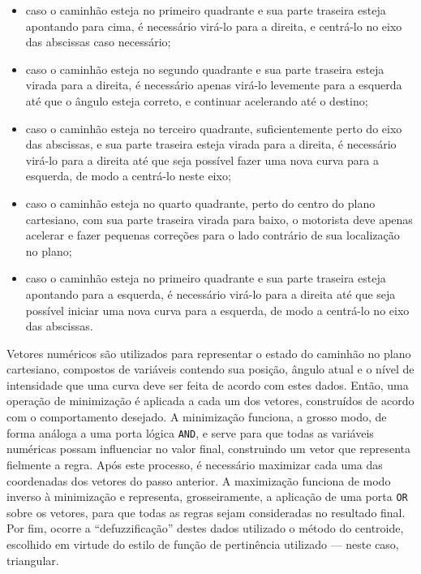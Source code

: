 \documentclass{../../sftex/sftex}
\begin{document}
\begin{itemize}

    \item caso o caminhão esteja no primeiro quadrante e sua parte traseira
        esteja apontando para cima, é necessário virá-lo para a direita, e
        centrá-lo no eixo das abscissas caso necessário;

    \item caso o caminhão esteja no segundo quadrante e sua parte traseira
        esteja virada para a direita, é necessário apenas virá-lo levemente
        para a esquerda até que o ângulo esteja correto, e continuar
        acelerando até o destino;

    \item caso o caminhão esteja no terceiro quadrante, suficientemente perto
        do eixo das abscissas, e sua parte traseira esteja virada para a
        direita, é necessário virá-lo para a direita até que seja possível
        fazer uma nova curva para a esquerda, de modo a centrá-lo neste eixo;

    \item caso o caminhão esteja no quarto quadrante, perto do centro do plano
        cartesiano, com sua parte traseira virada para baixo, o motorista
        deve apenas acelerar e fazer pequenas correções para o lado contrário
        de sua localização no plano;

    \item caso o caminhão esteja no primeiro quadrante e sua parte traseira
        esteja apontando para a esquerda, é necessário virá-lo para a direita
        até que seja possível iniciar uma nova curva para a esquerda, de
        modo a centrá-lo no eixo das abscissas.

\end{itemize}

Vetores numéricos são utilizados para representar o estado do caminhão no
plano cartesiano, compostos de variáveis contendo sua posição, ângulo atual
e o nível de intensidade que uma curva deve ser feita de acordo com estes
dados. Então, uma operação de minimização é aplicada a cada um dos vetores,
construídos de acordo com o comportamento desejado. A minimização funciona,
a grosso modo, de forma análoga a uma porta lógica \texttt{AND}, e serve para
que todas as variáveis numéricas possam influenciar no valor final,
construindo um vetor que representa fielmente a regra. Após este processo, é
necessário maximizar cada uma das coordenadas dos vetores do passo anterior.
A maximização funciona de modo inverso à minimização e representa,
grosseiramente, a aplicação de uma porta \texttt{OR} sobre os vetores, para
que todas as regras sejam consideradas no resultado final. Por fim, ocorre a
``defuzzificação'' destes dados utilizado o método do centroide, escolhido em
virtude do estilo de função de pertinência utilizado --- neste caso,
triangular. \medskip
\end{document}
